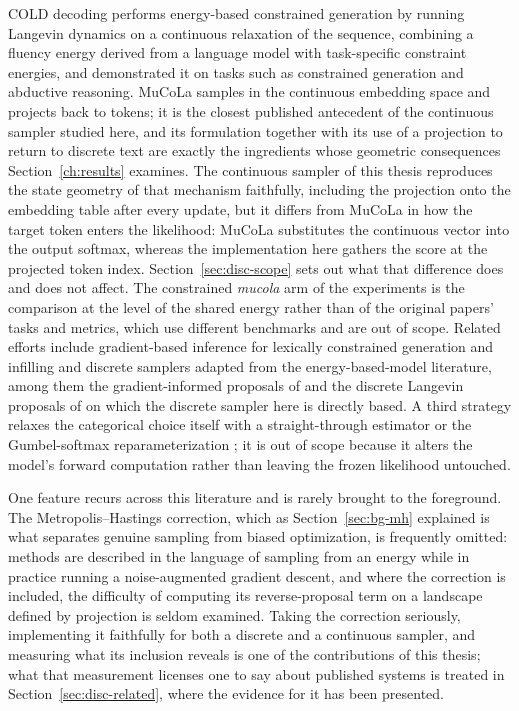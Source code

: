 COLD decoding \citep{qin2022cold} performs energy-based constrained generation by running Langevin dynamics on a continuous relaxation of the sequence, combining a fluency energy derived from a language model with task-specific constraint energies, and demonstrated it on tasks such as constrained generation and abductive reasoning. MuCoLa \citep{kumar2022gradient} samples in the continuous embedding space and projects back to tokens; it is the closest published antecedent of the continuous sampler studied here, and its formulation together with its use of a projection to return to discrete text are exactly the ingredients whose geometric consequences Section~\ref{ch:results} examines. The continuous sampler of this thesis reproduces the state geometry of that mechanism faithfully, including the projection onto the embedding table after every update, but it differs from MuCoLa in how the target token enters the likelihood: MuCoLa substitutes the continuous vector into the output softmax, whereas the implementation here gathers the score at the projected token index. Section~\ref{sec:disc-scope} sets out what that difference does and does not affect. The constrained \emph{mucola} arm of the experiments is the comparison at the level of the shared energy rather than of the original papers' tasks and metrics, which use different benchmarks and are out of scope. Related efforts include gradient-based inference for lexically constrained generation and infilling \citep{sha2020gradient} and discrete samplers adapted from the energy-based-model literature, among them the gradient-informed proposals of \citet{grathwohl2021oops} and the discrete Langevin proposals of \citet{zhang2022langevin} on which the discrete sampler here is directly based. A third strategy relaxes the categorical choice itself with a straight-through estimator \citep{bengio2013estimating} or the Gumbel-softmax reparameterization \citep{jang2017categorical}; it is out of scope because it alters the model's forward computation rather than leaving the frozen likelihood untouched.

One feature recurs across this literature and is rarely brought to the foreground. The Metropolis--Hastings correction, which as Section~\ref{sec:bg-mh} explained is what separates genuine sampling from biased optimization, is frequently omitted: methods are described in the language of sampling from an energy while in practice running a noise-augmented gradient descent, and where the correction is included, the difficulty of computing its reverse-proposal term on a landscape defined by projection is seldom examined. Taking the correction seriously, implementing it faithfully for both a discrete and a continuous sampler, and measuring what its inclusion reveals is one of the contributions of this thesis; what that measurement licenses one to say about published systems is treated in Section~\ref{sec:disc-related}, where the evidence for it has been presented.

